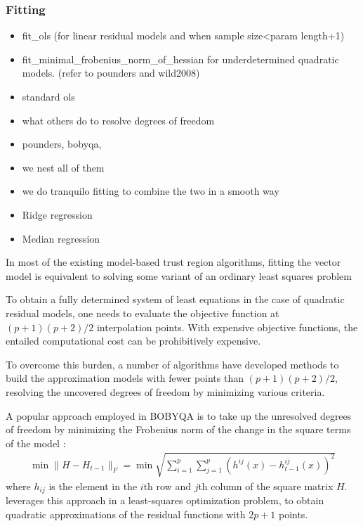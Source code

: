 \subsubsection{Fitting}
\label{subsubsec:fitting}
\begin{itemize}
    \item fit\_ols (for linear residual models and when sample size<param length+1)
    \item fit\_minimal\_frobenius\_norm\_of\_hessian for underdetermined quadratic models. (refer to pounders and wild2008)
    \item standard ols
    \item what others do to resolve degrees of freedom
    \item pounders, bobyqa,
    \item we nest all of them
    \item we do tranquilo fitting to combine the two in a smooth way

    \item Ridge regression
    \item Median regression
\end{itemize}


In most of the existing model-based trust region algorithms, fitting the vector model is equivalent to solving some variant of an ordinary least squares problem

To obtain a fully determined system of least equations in the case of quadratic residual models, one needs to evaluate the objective function at $(p+1)(p+2)/2$ interpolation points. With expensive objective functions, the entailed computational cost can be prohibitively expensive.

To overcome this burden, a number of algorithms have developed methods to build the approximation models with fewer points than  $(p+1)(p+2)/2$, resolving the uncovered degrees of freedom by minimizing various criteria.

A popular approach employed in BOBYQA is to take up the unresolved degrees of freedom by minimizing the Frobenius norm of the change in the square terms of the model \citet{Powell2003}:
\begin{align}
    \min\lVert H-H_{t-1}\rVert_F = \min\sqrt{\sum\limits_{i=1}^p\sum\limits_{j=1}^{p}(h^{ij}(x)-h^{ij}_{t-1}(x))^2}
    \label{eq:min-frob-diff}
\end{align}
where $h_{ij}$ is the element in the $i$th row and $j$th column of the square matrix $H$. \cite{Zhang2010} leverages this approach in a least-squares optimization problem, to obtain quadratic approximations of the residual functions with $2p+1$ points.

